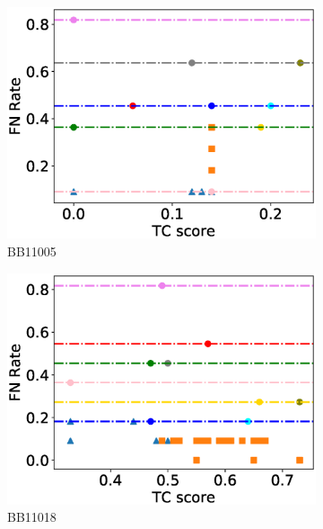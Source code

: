 \begin{figure}[!htbp]
\begin{adjustwidth}{-1cm}{-1cm}
		\begin{subfigure}{0.26\textwidth}
			\includegraphics[width=\columnwidth]{Figure/summary/precomputedInit/Balibase/BB11005_fnrate_vs_tc_2}
			\caption{BB11005}
		\end{subfigure}    
		\begin{subfigure}{0.26\textwidth}
			\includegraphics[width=\columnwidth]{Figure/summary/precomputedInit/Balibase/BB11018_fnrate_vs_tc_2}
			\caption{BB11018}
		\end{subfigure}
		\begin{subfigure}{0.26\textwidth}

\end{subfigure}
\end{adjustwidth}
\end{figure}

